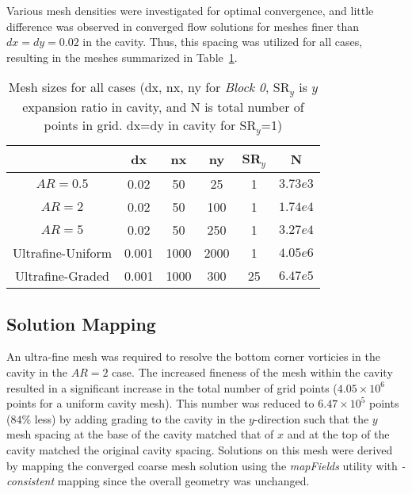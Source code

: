 \documentclass[twocolumn,10pt]{asme2ej}
\begin{document}
Various mesh densities were investigated for optimal convergence, and little difference was observed in converged flow solutions for meshes finer than $dx=dy=0.02$ in the cavity.  Thus, this spacing was utilized for all cases, resulting in the meshes summarized in Table~\ref{Grids}.

\begin{table}[htb]
\begin{center}
\label{Grids}
\begin{tabular}{|c | c c c c c |}
\hline
{} & \textbf{dx} & \textbf{nx} & \textbf{ny} & \textbf{SR$_y$} & \textbf{N}\\
\hline
\textbf{$AR=0.5$} & 0.02 & 50 & 25 & 1 & $3.73e3$ \\
\textbf{$AR=2$} & 0.02 & 50 & 100 & 1 & $1.74e4$ \\
\textbf{$AR=5$} & 0.02 & 50 & 250 & 1 & $3.27e4$ \\
\footnotesize{Ultrafine-Uniform} & 0.001 & 1000 & 2000 & 1 & $4.05e6$ \\
\footnotesize{Ultrafine-Graded} & 0.001 & 1000 & 300 & 25 & $6.47e5$ \\
\hline
\end{tabular}
\caption{Mesh sizes for all cases (dx, nx, ny for \emph{Block 0}, SR$_y$ is $y$ expansion ratio in cavity, and N is total number of points in grid.  dx=dy in cavity for SR$_y$=1)}
\end{center}
\end{table}

\subsection{Solution Mapping}

An ultra-fine mesh was required to resolve the bottom corner vorticies in the cavity in the $AR=2$ case.  The increased fineness of the mesh within the cavity resulted in a significant increase in the total number of grid points ($4.05\times10^6$ points for a uniform cavity mesh).  This number was reduced to $6.47\times10^5$ points ($84\%$ less) by adding grading to the cavity in the $y$-direction such that the $y$ mesh spacing at the base of the cavity matched that of $x$ and at the top of the cavity matched the original cavity spacing.  Solutions on this mesh were derived by mapping the converged coarse mesh solution using the \emph{mapFields} utility with \emph{-consistent} mapping since the overall geometry was unchanged.
\end{document}
